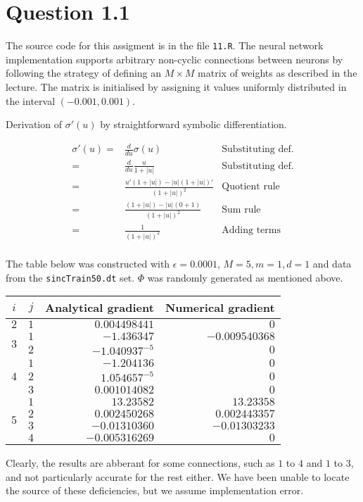 \section*{Question 1.1}

	
	

The source code for this assigment is in the file \texttt{11.R}.  The
neural network implementation supports arbitrary non-cyclic
connections between neurons by following the strategy of defining an
$M\times M$ matrix of weights as described in the lecture.  The matrix
is initialised by assigning it values uniformly distributed in the
interval $(-0.001, 0.001)$.

Derivation of $\sigma'(u)$ by straightforward symbolic
differentiation.

\begin{align*}
  \sigma'(u)=&\frac{d}{du}\sigma(u) & \text{Substituting def.} \\
  =&\frac{d}{du}\frac{u}{1+|u|} & \text{Substituting def.} \\
  =&\frac{u'(1+|u|)-|u|(1+|u|)'}{(1+|u|)^2} & \text{Quotient rule}\\
  =&\frac{(1+|u|)-|u|(0+1)}{(1+|u|)^2} & \text{Sum rule}\\
  =&\frac{1}{(1+|u|)^2} & \text{Adding terms}\\
\end{align*}

The table below was constructed with $\epsilon=0.0001$, $M=5, m=1,
d=1$ and data from the \texttt{sincTrain50.dt} set.  $\Phi$ was
randomly generated as mentioned above.

\begin{tabular}{c|c|r|r}
$i$ & $j$ & Analytical gradient & Numerical gradient \\\hline
\multirow{1}{*}{$2$} & $1$ & $0.004498441$ & $0$ \\\hline
\multirow{2}{*}{$3$} & $1$ & $-1.436347$ & $-0.009540368$ \\
& $2$ & $-1.040937^{-5}$ & $0$ \\\hline
\multirow{3}{*}{$4$} & $1$ & $-1.204136$ & $0$ \\
& $2$ & $1.054657^{-5}$ & $0$ \\
& $3$ & $0.001014082$ & $0$ \\\hline
\multirow{4}{*}{$5$} & $1$ & $13.23582$ & $13.23358$ \\
& $2$ & $0.002450268$ & $0.002443357$ \\
& $3$ & $-0.01310360$ & $-0.01303233$ \\
& $4$ & $-0.005316269$ & $0$ \\\hline
\end{tabular}

Clearly, the results are abberant for some connections, such as $1$ to
$4$ and $1$ to $3$, and not particularly accurate for the rest either.
We have been unable to locate the source of these deficiencies, but we
assume implementation error.
